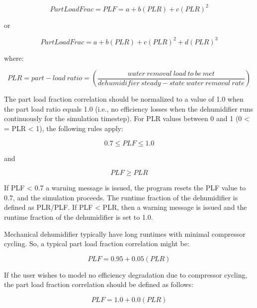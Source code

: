 \begin{equation}
PartLoadFrac = PLF = a + b\left( {PLR} \right) + c{\left( {PLR} \right)^2}
\end{equation}

or

\begin{equation}
PartLoadFrac = a + b\left( {PLR} \right) + c{\left( {PLR} \right)^2} + d{\left( {PLR} \right)^3}
\end{equation}

where:

\begin{equation}
PLR = part-load~ratio = \left( {\frac{{water~removal~load~to~be~met}}{{dehumidifier~steady-state~water~removal~rate}}} \right)
\end{equation}

The part load fraction correlation should be normalized to a value of 1.0 when the part load ratio equals 1.0 (i.e., no efficiency losses when the dehumidifier runs continuously for the simulation timestep). For PLR values between 0 and 1 (0 \textless{} = PLR \textless{} 1), the following rules apply:

\begin{equation}
0.7 \leq PLF \leq 1.0
\end{equation}

and

\begin{equation}
PLF \geq PLR
\end{equation}

If PLF \textless{} 0.7 a warning message is issued, the program resets the PLF value to 0.7, and the simulation proceeds. The runtime fraction of the dehumidifier is defined as PLR/PLF. If PLF \textless{} PLR, then a warning message is issued and the runtime fraction of the dehumidifier is set to 1.0.

Mechanical dehumidifier typically have long runtimes with minimal compressor cycling. So, a typical part load fraction correlation might be:

\begin{equation}
PLF = 0.95 + 0.05(PLR)
\end{equation}

If the user wishes to model no efficiency degradation due to compressor cycling, the part load fraction correlation should be defined as follows:

\begin{equation}
PLF = 1.0 + 0.0(PLR)
\end{equation}

